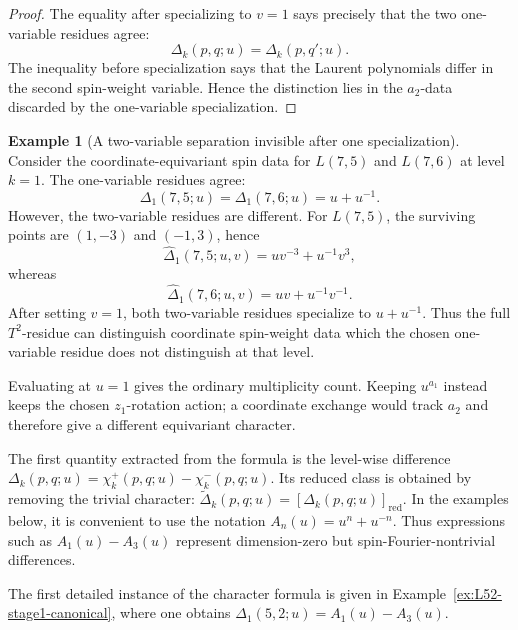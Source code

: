 \documentclass{article}
\theoremstyle{definition}
\newtheorem{example}[theorem]{Example}
\numberwithin{equation}{section}
\begin{document}
\begin{proof}
The equality after specializing to $v=1$ says precisely that the two one-variable residues agree:
\begin{equation}
\Delta_k(p,q;u)
=
\Delta_k(p,q';u).
\end{equation}
The inequality before specialization says that the Laurent polynomials differ in the second spin-weight variable.  Hence the distinction lies in the $a_2$-data discarded by the one-variable specialization.
\end{proof}

\begin{example}[A two-variable separation invisible after one specialization]
Consider the coordinate-equivariant spin data for $L(7,5)$ and $L(7,6)$ at level $k=1$.  The one-variable residues agree:
\begin{equation}
\Delta_1(7,5;u)=\Delta_1(7,6;u)=u+u^{-1}.
\end{equation}
However, the two-variable residues are different.  For $L(7,5)$, the surviving points are $(1,-3)$ and $(-1,3)$, hence
\begin{equation}
\widehat\Delta_1(7,5;u,v)=uv^{-3}+u^{-1}v^{3},
\end{equation}
whereas
\begin{equation}
\widehat\Delta_1(7,6;u,v)=uv+u^{-1}v^{-1}.
\end{equation}
After setting $v=1$, both two-variable residues specialize to $u+u^{-1}$.  Thus the full $T^2$-residue can distinguish coordinate spin-weight data which the chosen one-variable residue does not distinguish at that level.
\end{example}

Evaluating at $u=1$ gives the ordinary multiplicity count.  Keeping $u^{a_1}$ instead keeps the chosen $z_1$-rotation action; a coordinate exchange would track $a_2$ and therefore give a different equivariant character.

The first quantity extracted from the formula is the level-wise difference $\Delta_k(p,q;u)=\chi_k^+(p,q;u)-\chi_k^-(p,q;u).$ Its reduced class is obtained by removing the trivial character: $\widetilde\Delta_k(p,q;u)=[\Delta_k(p,q;u)]_{\operatorname{red}}.$ In the examples below, it is convenient to use the notation $A_n(u)=u^n+u^{-n}.$ Thus expressions such as $A_1(u)-A_3(u)$ represent dimension-zero but spin-Fourier-nontrivial differences.

The first detailed instance of the character formula is given in Example~\ref{ex:L52-stage1-canonical}, where one obtains $\Delta_1(5,2;u)=A_1(u)-A_3(u)$.
\end{document}
